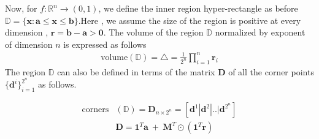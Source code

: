 Now, for $f: \mathbb{R}^{n} \rightarrow (0,1)$, we define the inner region hyper-rectangle as before $\mathbb{D} = \{\mathbf{x}: \mathbf{a} \leq \mathbf{x} \leq \mathbf{b}\}$.Here , we assume the size of the region is positive at every dimension , \ie $\mathbf{r} =  \mathbf{b} -  \mathbf{a} > \mathbf{0} $. The volume of the region $\mathbb{D}$ normalized by exponent of dimension $n$ is expressed as follows
\begin{equation}
\begin{aligned} 
\text{volume}(\mathbb{D}) = \triangle = \frac{1}{2^{n}}\prod_{i=1}^{n}\mathbf{r}_{i} 
\label{eq:n-vol-sup}
\end{aligned}
\end{equation}
The region $\mathbb{D}$ can also be defined in terms of the matrix $\mathbf{D}$ of all the corner points $\{\mathbf{d}^{i}\}_{i=1}^{2^{n}}$ as follows.

\begin{equation}
\begin{aligned} 
\text{corners}&(\mathbb{D}) = \mathbf{D}_{n\times 2^{n}} = \left[\mathbf{d}^{1} | \mathbf{d}^{2} |.. | \mathbf{d}^{2^{n}}\right] \\
&\mathbf{D} = \mathbf{1}^{T}\mathbf{a}~ +~ \mathbf{M}^{T} \odot (\mathbf{1}^{T}\mathbf{r})
\label{eq:n-corners-sup}
\end{aligned}
\end{equation}

